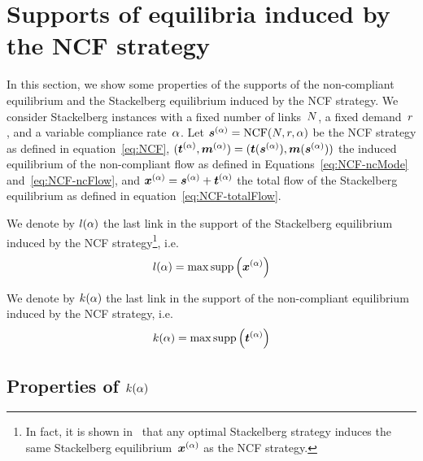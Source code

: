 
\section{Supports of equilibria induced by the NCF strategy}
\label{sec:support}

In this section, we show some properties of the supports of the non-compliant equilibrium and the Stackelberg equilibrium induced by the NCF strategy. We consider Stackelberg instances with a fixed number of links~$N$, a fixed demand~$r$, and a variable compliance rate~$\alpha$. Let $\boldsymbol {s}^{(\alpha)} = \textup{NCF} (N, r, \alpha)$ be the NCF strategy as defined in equation~\eqref{eq:NCF}, $(\boldsymbol {t}^{(\alpha)}, \boldsymbol {m}^{(\alpha)}) = (\boldsymbol {t}(\boldsymbol {s}^{(\alpha)}), \boldsymbol {m}(\boldsymbol {s}^{(\alpha)}))$ the induced equilibrium of the non-compliant flow as defined in Equations~\eqref{eq:NCF-ncMode} and~\eqref{eq:NCF-ncFlow}, and $\boldsymbol {x}^{(\alpha)} = \boldsymbol {s}^{(\alpha)} + \boldsymbol {t}^{(\alpha)}$ the total flow of the Stackelberg equilibrium as defined in equation~\eqref{eq:NCF-totalFlow}.

\vspace{5pt}
\begin{definition}
We denote by $l(\alpha)$ the last link in the support of the Stackelberg equilibrium induced by the NCF strategy\footnote{In fact, it is shown in~\cite{krichene12} that any optimal Stackelberg strategy induces the same Stackelberg equilibrium~$\boldsymbol {x}^{(\alpha)}$ as the NCF strategy.}, i.e.
\begin{equation}
l(\alpha) = \max \textup{supp} \left( \boldsymbol {x}^{(\alpha)} \right)
\label{eq:lastStack}
\end{equation}
\end{definition}

\vspace{5pt}
\begin{definition}
We denote by $k(\alpha)$ the last link in the support of the non-compliant equilibrium induced by the NCF strategy, i.e.
\begin{equation}
k(\alpha) = \max \textup{supp} \left( \boldsymbol {t}^{(\alpha)} \right)
\label{eq:lastNC}
\end{equation}
\end{definition}


\subsection{Properties of $k(\alpha)$}

